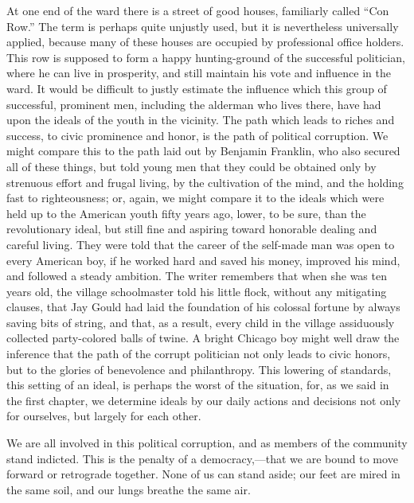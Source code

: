 \documentclass[]{article}
\begin{document}
\begin{sectionbody}
\addamsparagraph At one end of the ward there is a street of good houses, familiarly
called ``Con Row.'' The term is perhaps quite unjustly used, but it is
nevertheless universally applied, because many of these houses are
occupied by professional office holders. This row is supposed to form a
happy hunting-ground of the successful politician, where he can live in
prosperity, and still maintain his vote and influence in the ward. It
would be difficult to justly estimate the influence which this group of
successful, prominent men, including the alderman who lives there, have
had upon the ideals of the youth in the vicinity. The path which leads
to riches and success, to civic prominence and honor, is the path of
political corruption. We might compare this to the path laid out by
Benjamin Franklin, who also secured all of these things, but told young
men that they could be obtained only by strenuous effort and frugal
living, by the cultivation of the mind, and the holding fast to
righteousness; or, again, we might compare it to the ideals which were
held up to the American youth fifty years ago, lower, to be sure, than
the revolutionary ideal, but still fine and aspiring toward honorable
dealing and careful living. They were told that the career of the
self-made man was open to every American boy, if he worked hard and
saved his money, improved his mind, and followed a steady ambition. The
writer remembers that when she was ten years old, the village
schoolmaster told his little flock, without any mitigating clauses,
that Jay Gould had laid the foundation of his colossal fortune by always
saving bits of string, and that, as a result, every child in the village
assiduously collected party-colored balls of twine. A bright Chicago boy
might well draw the inference that the path of the corrupt politician
not only leads to civic honors, but to the glories of benevolence and
philanthropy. This lowering of standards, this setting of an ideal, is
perhaps the worst of the situation, for, as we said in the first
chapter, we determine ideals by our daily actions and decisions not only
for ourselves, but largely for each other.

\addamsparagraph We are all involved in this political corruption, and as members of the
community stand indicted. This is the penalty of a democracy,---that we
are bound to move forward or retrograde together. None of us can stand
aside; our feet are mired in the same soil, and our lungs breathe the
same air.


\end{sectionbody}
\end{document}
